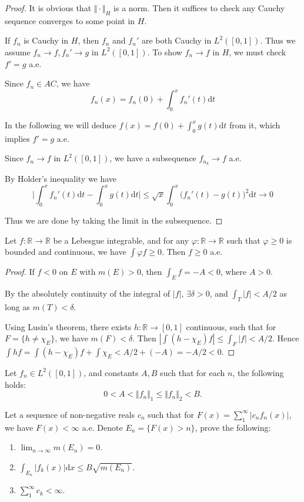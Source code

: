 \begin{proof}
	It is obvious that $ \Vert \cdot \Vert_{H} $ is a norm. Then it suffices to check any Cauchy sequence converges to some point in $ H $.
	
	If $ f_{n} $ is Cauchy in $ H $, then $ f_{n} $ and $ f_{n}' $ are both Cauchy in $ L^{2}([0,1]) $. Thus we assume $ f_{n}\to f,f_{n}'\to g $ in  $ L^{2}([0,1]) $. To show $ f_{n}\to f $ in $ H $, we must check $ f'=g $ a.e.
	
	Since $ f_{n}\in AC $, we have
	$$ f_{n}(x)=f_{n}(0)+\int_{0}^{x}f_{n}'(t)\mathrm{d} t $$
	
	In the following we will deduce $
	f( x ) =f( 0 ) +\int_0^x{g( t ) \mathrm{d} t}
	$ from it, which implies $ f'=g $ a.e. 
	
	Since $ f_{n}\to f $ in $ L^{2}([0,1]) $, we have a subsequence $ f_{n_{k}}\to f $ a.e.
	
	By Holder's inequality we have
	$$
	\bigg|\int_0^x{f_n'( t ) \mathrm{d} t}-\int_0^x{g( t ) \mathrm{d} t}\bigg|\le \sqrt{x}\int_0^x \big( f_n'( t ) -g( t ) \big) ^2\mathrm{d} t\rightarrow 0
	$$
	
	Thus we are done by taking the limit in the subsequence.
\end{proof}

\begin{problem}
Let $ f\colon\mathbb{R} \to \mathbb{R}  $ be a Lebesgue integrable, and for any $ \varphi\colon\mathbb{R} \to \mathbb{R}  $ such that $ \varphi\ge 0 $ is bounded and continuous, we have $ \int\varphi f\ge 0 $. Then $ f\ge 0 $ a.e.
\end{problem}

\begin{proof}
	If $ f<0 $ on $ E $ with $ m(E)>0 $, then $ \int _{E}f=-A<0 $, where $ A>0 $.
	
	By the absolutely continuity of the integral of $ |f| $, $\exists \delta>0 $, and $ \int _{T}|f|<A/2 $ as long as $ m(T)<\delta $.
	
	Using Lusin's theorem, there exists $ h\colon \mathbb{R} \to [0,1] $ continuous, such that for $ F=\{h\ne \chi _{E}\} $, we have $ m(F)<\delta $. Then $ |\int(h-\chi_{E})f|\le \int _{F}|f|<A/2 $. 
    Hence $ \int hf=\int (h-\chi_{E})f+\int \chi_{E}<A/2+(-A)=-A/2<0 $.
\end{proof}

\begin{problem}
Let $ f_{n}\in L^{2}([0,1]) $, and constants $ A,B $ such that for each $ n $, the following holds:
$$ 0<A<\Vert f_{n} \Vert_{1}\le \Vert f_{n} \Vert_{2}<B. $$

Let a sequence of non-negative reals $ c_{n} $ such that for $ F(x)=\sum_{1}^{\infty}|c_{n}f_{n}(x)| $, we have $ F(x)<\infty $ a.e. Denote $ E_{n}=\{F(x)>n\} $, prove the following:
\begin{enumerate}
\item
$
 \lim_{n\rightarrow \infty}m( E_n ) =0
$.
\item
$
 \int_{E_n}^{}{|f_{k}( x ) |\mathrm{d} x}\le B\sqrt{m(E_n)}
$.
\item 
$
 \sum_1^{\infty}{c_k}<\infty 
$.
\end{enumerate}
\end{problem}

